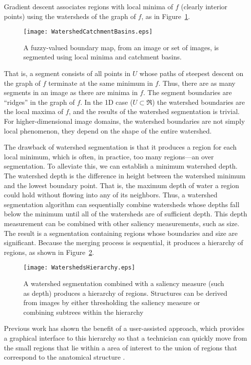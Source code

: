 Gradient descent associates regions with local minima of $f$ (clearly interior
points) using the watersheds of the graph of $f$, as in
Figure~\ref{fig:segment}.
\begin{figure}
\centering
\texttt{[image: WatershedCatchmentBasins.eps]}
\caption[Watershed catchment basins]{A fuzzy-valued boundary map, from an image
or set of images, is segmented using local minima and catchment basins.}
\protect\label{fig:segment}
\end{figure}
That is, a segment consists of all points in $U$ whose paths of steepest
descent on the graph of $f$ terminate at the same minimum in $f$.  Thus, there
are as many segments in an image as there are minima in $f$.  The segment
boundaries are ``ridges'' \cite{Koenderink1979,Koenderink1993,Eberly1996} in
the graph of $f$.  In the 1D case ($U \subset \Re$) the watershed boundaries
are the local maxima of $f$, and the results of the watershed segmentation is
trivial.  For higher-dimensional image domains, the watershed boundaries are
not simply local phenomenon, they depend on the shape of the entire watershed.

The drawback of watershed segmentation is that it produces a region for each
local minimum, which is often, in practice, too many regions---an over
segmentation.  To alleviate this, we can establish a minimum watershed depth.
The watershed depth is the difference in height between the watershed minimum
and the lowest boundary point.  That is, the maximum depth of water a region
could hold without flowing into any of its neighbors.  Thus, a watershed
segmentation algorithm can sequentially combine watersheds whose depths fall
below the minimum until all of the watersheds are of sufficient depth.  This
depth measurement can be combined with other saliency measurements, such as
size.  The result is a segmentation containing regions whose boundaries and
size are significant.  Because the merging process is sequential, it produces a
hierarchy of regions, as shown in Figure~\ref{fig:watersheds}.
\begin{figure}
\centering
\texttt{[image: WatershedsHierarchy.eps]}
\caption[Watersheds hierarchy of regions]{A watershed segmentation combined
with a saliency measure (such as depth) produces a hierarchy of regions.
Structures can be derived from images by either thresholding the saliency
measure or combining subtrees within the hierarchy}
\protect\label{fig:watersheds}
\end{figure}
Previous work has shown the benefit of a user-assisted approach, which provides
a graphical interface to this hierarchy so that a technician can quickly move
from the small regions that lie within a area of interest to the union of
regions that correspond to the anatomical structure \cite{Yoo1991}.


